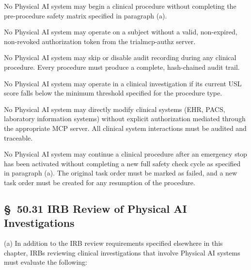 \documentclass[11pt]{article}
\begin{document}
\begin{description}[leftmargin=1.0cm,style=sameline]
\item[(1)] No Physical AI system may begin a clinical procedure without completing the pre-procedure safety matrix specified in paragraph (a).
\item[(2)] No Physical AI system may operate on a subject without a valid, non-expired, non-revoked authorization token from the trialmcp-authz server.
\item[(3)] No Physical AI system may skip or disable audit recording during any clinical procedure. Every procedure must produce a complete, hash-chained audit trail.
\item[(4)] No Physical AI system may operate in a clinical investigation if its current USL score falls below the minimum threshold specified for the procedure type.
\item[(5)] No Physical AI system may directly modify clinical systems (EHR, PACS, laboratory information systems) without explicit authorization mediated through the appropriate MCP server. All clinical system interactions must be audited and traceable.
\item[(6)] No Physical AI system may continue a clinical procedure after an emergency stop has been activated without completing a new full safety check cycle as specified in paragraph (a). The original task order must be marked as failed, and a new task order must be created for any resumption of the procedure.
\end{description}

\subsection{\S~50.31 IRB Review of Physical AI Investigations}

(a) In addition to the IRB review requirements specified elsewhere in this chapter, IRBs reviewing clinical investigations that involve Physical AI systems must evaluate the following:
\end{document}
